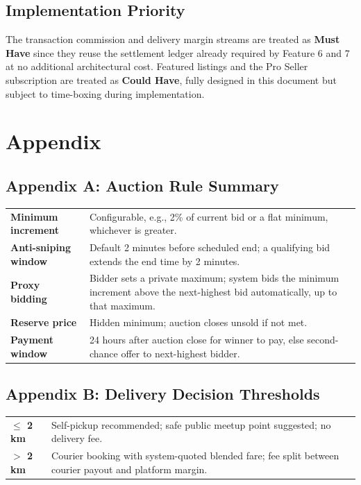 \documentclass[11pt,a4paper]{report}
\newenvironment{reqtable}{\begin{longtable}{p{2.2cm}p{11.5cm}}}{\end{longtable}}
\begin{document}
\section{Implementation Priority}
The transaction commission and delivery margin streams are treated as \textbf{Must Have} since they reuse the settlement ledger already required by Feature 6 and 7 at no additional architectural cost. Featured listings and the Pro Seller subscription are treated as \textbf{Could Have}, fully designed in this document but subject to time-boxing during implementation.

\chapter{Appendix}

\section{Appendix A: Auction Rule Summary}
\begin{reqtable}
\textbf{Minimum increment} & Configurable, e.g., 2\% of current bid or a flat minimum, whichever is greater. \\
\textbf{Anti-sniping window} & Default 2 minutes before scheduled end; a qualifying bid extends the end time by 2 minutes. \\
\textbf{Proxy bidding} & Bidder sets a private maximum; system bids the minimum increment above the next-highest bid automatically, up to that maximum. \\
\textbf{Reserve price} & Hidden minimum; auction closes unsold if not met. \\
\textbf{Payment window} & 24 hours after auction close for winner to pay, else second-chance offer to next-highest bidder. \\
\end{reqtable}

\section{Appendix B: Delivery Decision Thresholds}
\begin{reqtable}
\textbf{$\leq$ 2 km} & Self-pickup recommended; safe public meetup point suggested; no delivery fee. \\
\textbf{$>$ 2 km} & Courier booking with system-quoted blended fare; fee split between courier payout and platform margin. \\
\end{reqtable}
\end{document}
